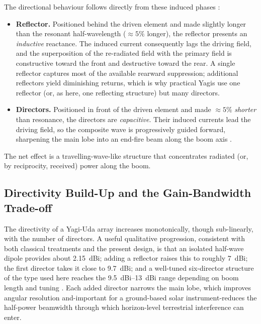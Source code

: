 The directional behaviour follows directly from these induced phases
\citep{kraus1988,stutzman2013}:
\begin{itemize}[leftmargin=1.6em]
    \item \textbf{Reflector.} Positioned behind the driven element and made
    slightly longer than the resonant half-wavelength ($\approx\!5\%$ longer),
    the reflector presents an \emph{inductive} reactance. The induced current
    consequently lags the driving field, and the superposition of the
    re-radiated field with the primary field is constructive toward the front
    and destructive toward the rear. A single reflector captures most of the
    available rearward suppression; additional reflectors yield diminishing
    returns, which is why practical Yagis use one reflector (or, as here, one
    reflecting structure) but many directors.
    \item \textbf{Directors.} Positioned in front of the driven element and made
    $\approx\!5\%$ \emph{shorter} than resonance, the directors are
    \emph{capacitive}. Their induced currents lead the driving field, so the
    composite wave is progressively guided forward, sharpening the main lobe
    into an end-fire beam along the boom axis \citep{balanis2016}.
\end{itemize}
The net effect is a travelling-wave-like structure that concentrates radiated
(or, by reciprocity, received) power along the boom.

\subsection{Directivity Build-Up and the Gain-Bandwidth Trade-off}
\label{subsec:directivity}

The directivity of a Yagi-Uda array increases monotonically, though
sub-linearly, with the number of directors. A useful qualitative progression,
consistent with both classical treatments and the present design, is that an
isolated half-wave dipole provides about \SI{2.15}{dBi}; adding a reflector
raises this to roughly \SI{7}{dBi}; the first director takes it close to
\SI{9.7}{dBi}; and a well-tuned six-director structure of the type used here
reaches the \SIrange{9.5}{13}{dBi} range depending on boom length and tuning
\citep{balanis2016,stutzman2013}. Each added director narrows the main lobe,
which improves angular resolution and-important for a ground-based solar
instrument-reduces the half-power beamwidth through which horizon-level
terrestrial interference can enter.


